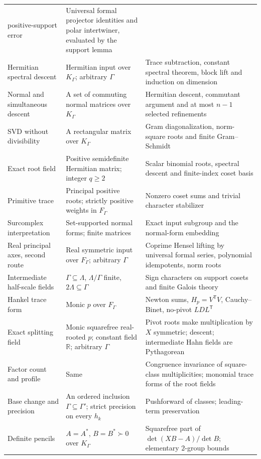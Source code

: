 \documentclass[11pt,a4paper]{article}
\numberwithin{equation}{section}
\theoremstyle{definition}
\theoremstyle{remark}
\newcommand{\R}{\mathbb R}
\begin{document}
\begin{longtable}{@{}P{.30\textwidth}P{.28\textwidth}P{.34\textwidth}@{}}
positive-support error & Universal formal projector identities and polar
intertwiner, evaluated by the support lemma\\
Hermitian spectral descent & Hermitian input over $K_\Gamma$;
arbitrary $\Gamma$ & Trace subtraction, constant spectral theorem,
block lift and induction on dimension\\
Normal and simultaneous descent & A set of commuting normal matrices
over $K_\Gamma$ & Hermitian descent, commutant argument and at most $n-1$
selected refinements\\
SVD without divisibility & A rectangular matrix over $K_\Gamma$ & Gram
diagonalization, norm-square roots and finite Gram--Schmidt\\
Exact root field & Positive semidefinite Hermitian matrix; integer $q\ge2$
& Scalar binomial roots, spectral descent and finite-index coset basis\\
Primitive trace & Principal positive roots; strictly positive weights in
$F_\Gamma$ & Nonzero coset sums and trivial character stabilizer\\
Surcomplex interpretation & Set-supported normal forms; finite matrices
& Exact input subgroup and the normal-form embedding\\
\addlinespace
Real principal axes, second route & Real symmetric input over $F_\Gamma$;
arbitrary $\Gamma$ & Coprime Hensel lifting by universal formal series,
polynomial idempotents, norm roots\\
Intermediate half-scale fields & $\Gamma\subseteq\Lambda$, $\Lambda/\Gamma$ finite,
$2\Lambda\subseteq\Gamma$ & Sign characters on support cosets and finite
Galois theory\\
Hankel trace form & Monic $p$ over $F_\Gamma$ & Newton sums,
$H_p=V^{\mathsf T}V$, Cauchy--Binet, no-pivot $LDL^{\mathsf T}$\\
Exact splitting field & Monic squarefree real-rooted $p$; constant field $\R$;
arbitrary $\Gamma$ & Pivot roots make multiplication by $X$ symmetric;
descent; intermediate Hahn fields are Pythagorean\\
Factor count and profile & Same & Congruence invariance of square-class
multiplicities; monomial trace forms of the root fields\\
Base change and precision & An ordered inclusion $\Gamma\subseteq\Gamma'$;
strict precision on every $h_k$ & Pushforward of classes; leading-term
preservation\\
Definite pencils & $A=A^*$, $B=B^*\succ0$ over $K_\Gamma$ & Squarefree part of
$\det(XB-A)/\det B$; elementary $2$-group bounds\\
\bottomrule
\end{longtable}
\end{document}

